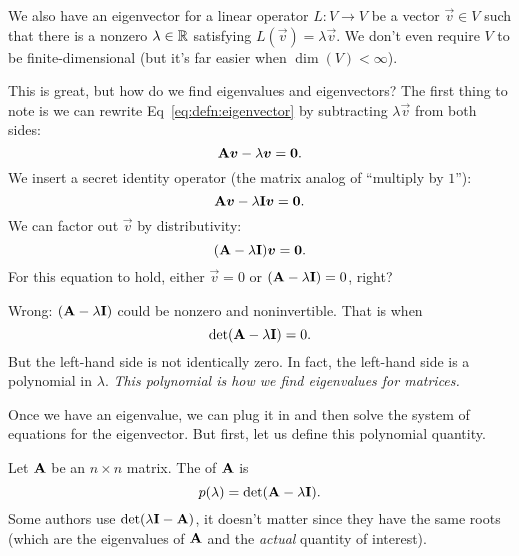 \begin{remark}
We also have an eigenvector for a linear operator $L\colon V\to V$
be a vector $\vec{v}\in V$ such that there is a nonzero $\lambda\in\mathbb{R}$
satisfying $L(\vec{v})=\lambda\vec{v}$.
We don't even require $V$ to be finite-dimensional (but it's far easier
when $\dim(V)<\infty$).
\end{remark}

This is great, but how do we find eigenvalues and eigenvectors?
The first thing to note is we can rewrite Eq~\eqref{eq:defn:eigenvector}
by subtracting $\lambda\vec{v}$ from both sides:
\begin{equation}
\mathbf{A}\boldsymbol{v}-\lambda\boldsymbol{v}=\boldsymbol{0}.
\end{equation}
We insert a secret identity operator (the matrix analog of ``multiply by $1$''):
\begin{equation}
\mathbf{A}\boldsymbol{v}-\lambda\mathbf{I}\boldsymbol{v}=\boldsymbol{0}.
\end{equation}
We can factor out $\vec{v}$ by distributivity:
\begin{equation}
(\mathbf{A}-\lambda\mathbf{I})\boldsymbol{v}=\boldsymbol{0}.
\end{equation}
For this equation to hold, either $\vec{v}=0$ or
$(\mathbf{A}-\lambda\mathbf{I})=0$, right?

Wrong: $(\mathbf{A}-\lambda\mathbf{I})$ could be nonzero and noninvertible.
That is when
\begin{equation}
\det(\mathbf{A}-\lambda\mathbf{I})=0.
\end{equation}
But the left-hand side is not identically zero. In fact, the left-hand
side is a polynomial in $\lambda$.
\emph{This polynomial is how we find eigenvalues for matrices.}

Once we have an eigenvalue, we can plug it in and then solve the system
of equations for the eigenvector. But first, let us define this
polynomial quantity.

\begin{definition}
Let $\mathbf{A}$ be an $n\times n$ matrix.
The  of $\mathbf{A}$ is
\begin{equation}
p(\lambda) = \det(\mathbf{A}-\lambda\mathbf{I}).
\end{equation}
Some authors use $\det(\lambda\mathbf{I}-\mathbf{A})$, it doesn't matter since
they have the same roots (which are the eigenvalues of $\mathbf{A}$ and the
\emph{actual} quantity of interest).
\end{definition}

